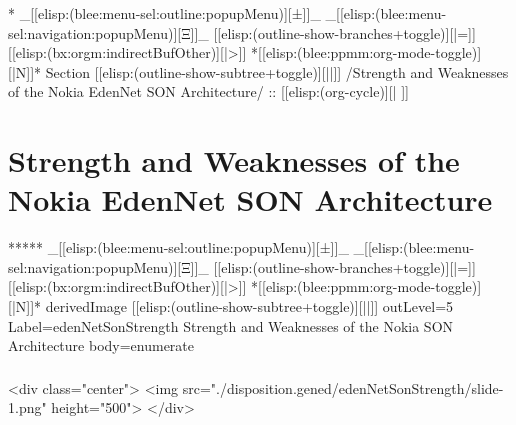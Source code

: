 \begin{whenOrg}
*  _[[elisp:(blee:menu-sel:outline:popupMenu)][±]]_ _[[elisp:(blee:menu-sel:navigation:popupMenu)][Ξ]]_ [[elisp:(outline-show-branches+toggle)][|=]] [[elisp:(bx:orgm:indirectBufOther)][|>]] *[[elisp:(blee:ppmm:org-mode-toggle)][|N]]*  Section    [[elisp:(outline-show-subtree+toggle)][||]]   /Strength and Weaknesses of the Nokia EdenNet SON Architecture/ ::  [[elisp:(org-cycle)][| ]]
\end{whenOrg}

\section{Strength and Weaknesses of the Nokia EdenNet SON Architecture}


\begin{whenOrg}
*****  _[[elisp:(blee:menu-sel:outline:popupMenu)][±]]_ _[[elisp:(blee:menu-sel:navigation:popupMenu)][Ξ]]_ [[elisp:(outline-show-branches+toggle)][|=]] [[elisp:(bx:orgm:indirectBufOther)][|>]] *[[elisp:(blee:ppmm:org-mode-toggle)][|N]]*  derivedImage [[elisp:(outline-show-subtree+toggle)][||]] outLevel=5 Label=edenNetSonStrength Strength and Weaknesses of the Nokia SON Architecture body=enumerate
\end{whenOrg}

\begin{htmlonly}

\begin{frame}[fragile,plain,label=edenNetSonStrength]
    \frametitle{}
    \framesubtitle{}
    \begin{rawhtml}
<div class="center">
<img src="./disposition.gened/edenNetSonStrength/slide-1.png" height="500">
</div>
    \end{rawhtml}
\end{frame}
\end{htmlonly}

